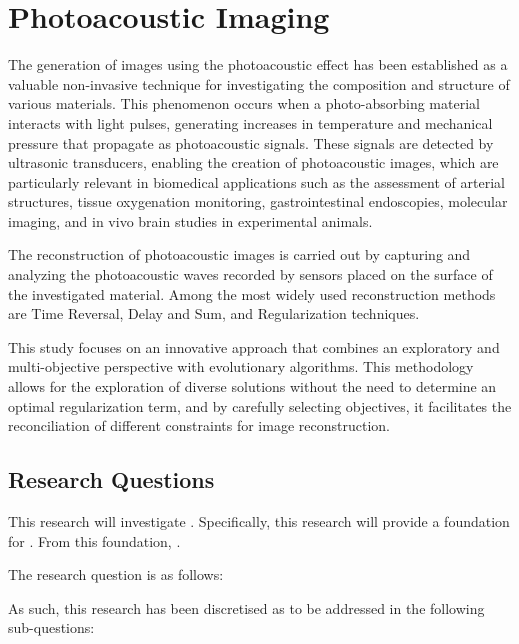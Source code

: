 \lipsum[1-4]
\lipsum[6]

\section{Photoacoustic Imaging} \label{sec:intro}

The generation of images using the photoacoustic effect has been established as a valuable non-invasive technique for investigating the composition and structure of various materials. This phenomenon occurs when a photo-absorbing material interacts with light pulses, generating increases in temperature and mechanical pressure that propagate as photoacoustic signals. These signals are detected by ultrasonic transducers, enabling the creation of photoacoustic images, which are particularly relevant in biomedical applications such as the assessment of arterial structures, tissue oxygenation monitoring, gastrointestinal endoscopies, molecular imaging, and in vivo brain studies in experimental animals.

The reconstruction of photoacoustic images is carried out by capturing and analyzing the photoacoustic waves recorded by sensors placed on the surface of the investigated material. Among the most widely used reconstruction methods are Time Reversal, Delay and Sum, and Regularization techniques.

This study focuses on an innovative approach that combines an exploratory and multi-objective perspective with evolutionary algorithms. This methodology allows for the exploration of diverse solutions without the need to determine an optimal regularization term, and by carefully selecting objectives, it facilitates the reconciliation of different constraints for image reconstruction.

\subsection{Research Questions}\label{sec:ques}

This research will investigate \lipsum[][1]. Specifically, this research will provide a foundation for \lipsum[][2]. From this foundation, \lipsum[][3].


The research question is as follows:

\begin{quote}
    \textit{\lipsum[][4]}
\end{quote}

\lipsum[][5-6]
As such, this research has been discretised as to be addressed in the following sub-questions:

